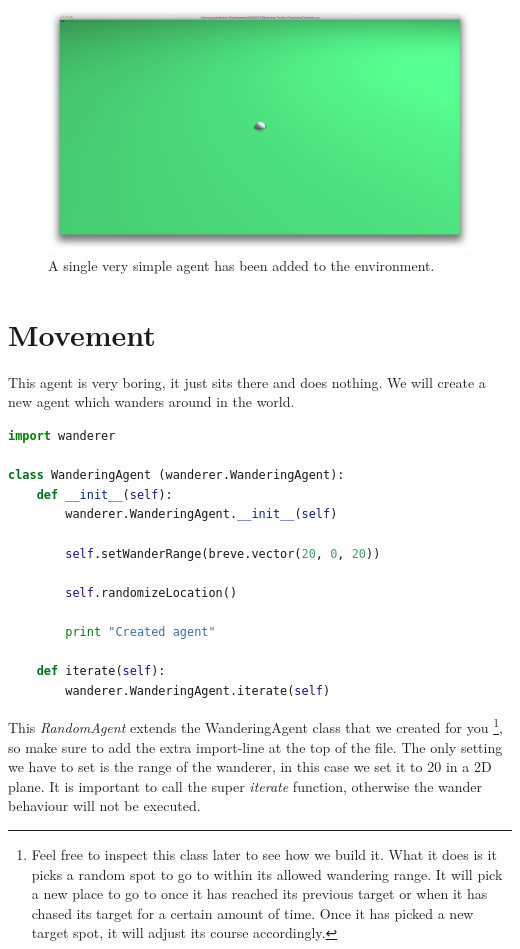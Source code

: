 

\begin{figure}[htbp]
\begin{center}
\includegraphics{graphics/simpleagent}
\caption{A single very simple agent has been added to the environment.}
\end{center}
\end{figure}

\section{Movement}
This agent is very boring, it just sits there and does nothing. We will create a new agent which wanders around in the world.

\begin{fullwidth}
\begin{lstlisting}[language=Python]
import wanderer

class WanderingAgent (wanderer.WanderingAgent):
	def __init__(self):
		wanderer.WanderingAgent.__init__(self)

		self.setWanderRange(breve.vector(20, 0, 20))
		
		self.randomizeLocation()
		
		print "Created agent"

	def iterate(self):
		wanderer.WanderingAgent.iterate(self)
\end{lstlisting}
\end{fullwidth}


This \textit{RandomAgent} extends the WanderingAgent class that we created for you \footnote{Feel free to inspect this class later to see how we build it. What it does is it picks a random spot to go to within its allowed wandering range. It will pick a new place to go to once it has reached its previous target or when it has chased its target for a certain amount of time. Once it has picked a new target spot, it will adjust its course accordingly.}, so make sure to add the extra import-line at the top of the file. The only setting we have to set is the range of the wanderer, in this case we set it to 20 in a 2D plane. It is important to call the super \textit{iterate} function, otherwise the wander behaviour will not be executed.

